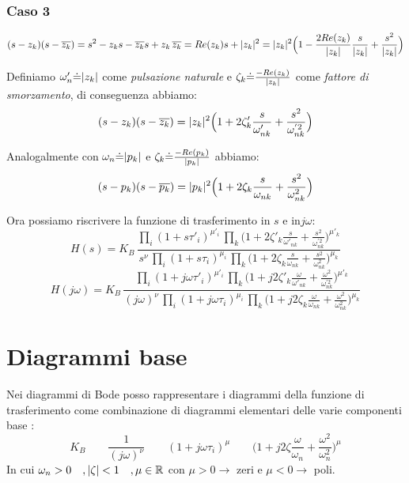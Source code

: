  \subsubsection{Caso 3}
 
 \[ 
 	(s-z_k)(s-\overline{z_k}) = s^2-z_ks-\overline{z_k}s+z_k \,\overline{z_k} = Re(z_k) s+\lvert z_k\rvert^2 = \lvert z_k\rvert^2\Big(1-\frac{2 Re(z_k)}{\lvert z_k\rvert}\frac{s}{\lvert z_k\rvert}+\frac{s^2}{\lvert z_k\rvert} \Big)
 \]

 Definiamo $ \omega'_n \dot{=} \lvert z_k\rvert $ come \emph{pulsazione naturale} e $ \zeta_k \dot{=} \frac{-Re(z_k)}{\lvert z_k\rvert} $ come \emph{fattore di smorzamento}, di conseguenza abbiamo: 
 \[ 
 	(s-z_k)(s-\overline{z_k}) = \lvert z_k\rvert^2\Big(1+2\zeta'_k\frac{s}{\omega'_{nk}}+\frac{s^2}{\omega^{'2}_{nk}} \Big)
  \]
  
  Analogalmente con $ \omega_n \dot{=} \lvert p_k\rvert $ e $ \zeta_k \dot{=} \frac{-Re(p_k)}{\lvert p_k\rvert} $ abbiamo:
   \[ 
  (s-p_k)(s-\overline{p_k}) = \lvert p_k\rvert^2\Big(1+2\zeta_k\frac{s}{\omega_{nk}}+\frac{s^2}{\omega^{2}_{nk}} \Big)
  \]
  
  Ora possiamo riscrivere la funzione di trasferimento in $ s $ e in$ j\omega $:
  \[ 
  	H(s) = K_B \, \frac{\prod_i (1+s\tau'_i)^{\mu'_i}\,  \prod_k \Big(1+2\zeta'_k\frac{s}{\omega'_{nk}}+\frac{s^2}{\omega^{'2}_{nk}} \Big)^{\mu'_k}}{s^\nu\, \prod_i (1+s\tau_i)^{\mu_i}\,  \prod_k \Big(1+2\zeta_k\frac{s}{\omega_{nk}}+\frac{s^2}{\omega^{2}_{nk}} \Big)^{\mu_k} }
   \]
     \[ 
   H(j\omega) = K_B \, \frac{\prod_i (1+j\omega\tau'_i)^{\mu'_i}\,  \prod_k \Big(1+j2\zeta'_k\frac{\omega}{\omega'_{nk}}+\frac{\omega^2}{\omega^{'2}_{nk}} \Big)^{\mu'_k}}{(j\omega)^\nu\, \prod_i (1+j\omega\tau_i)^{\mu_i}\,  \prod_k \Big(1+j2\zeta_k\frac{\omega}{\omega_{nk}}+\frac{\omega^2}{\omega^{2}_{nk}} \Big)^{\mu_k} }
   \]
  
\section{Diagrammi base}
   
   Nei diagrammi di Bode posso rappresentare i diagrammi della funzione di trasferimento come combinazione di diagrammi elementari delle varie componenti base :
\[ %
	K_B \qquad 
	\frac{1}{(j\omega)^\nu} \qquad 
	(1+j\omega\tau_i)^{\mu} \qquad 
	\Big(1+j2\zeta\frac{\omega}{\omega_{n}}+\frac{\omega^2}{\omega^{2}_{n}} \Big)^{\mu}
\]
In cui $ \omega_n > 0 \quad ,\lvert\zeta\rvert<1 \quad,\mu \in \mathbb{R} $ con $ \mu > 0 \rightarrow$ zeri e $ \mu < 0 \rightarrow$ poli.


